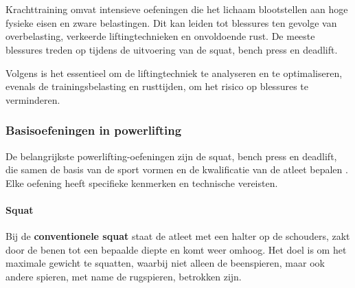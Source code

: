 \chapter{}%
\label{ch:stand-van-zaken}


\section{}%
\label{sec:krachttraining}
Krachttraining omvat intensieve oefeningen die het lichaam blootstellen aan hoge fysieke eisen en zware belastingen. 
Dit kan leiden tot blessures ten gevolge van overbelasting, verkeerde liftingtechnieken en onvoldoende rust. 
De meeste blessures treden op tijdens de uitvoering van de squat, bench press en deadlift. 

\medskip

Volgens \textcite{BengtssonEtAl2018} is het essentieel om de liftingtechniek te analyseren en te optimaliseren, evenals de trainingsbelasting en rusttijden, om het risico op blessures te verminderen.

\subsection{Basisoefeningen in powerlifting}
\label{subsec:basisoefeningen-in-powerlifting}
De belangrijkste powerlifting-oefeningen zijn de squat, bench press en deadlift, die samen de basis van de sport vormen en de kwalificatie van de atleet bepalen \autocite{TymchikEtAl2021}. 
Elke oefening heeft specifieke kenmerken en technische vereisten.

\subsubsection{Squat}
\label{subsubsec:squat}
Bij de \textbf{conventionele squat} staat de atleet met een halter op de schouders, zakt door de benen tot een bepaalde diepte en komt weer omhoog. 
Het doel is om het maximale gewicht te squatten, waarbij niet alleen de beenspieren, maar ook andere spieren, met name de rugspieren, betrokken zijn.

